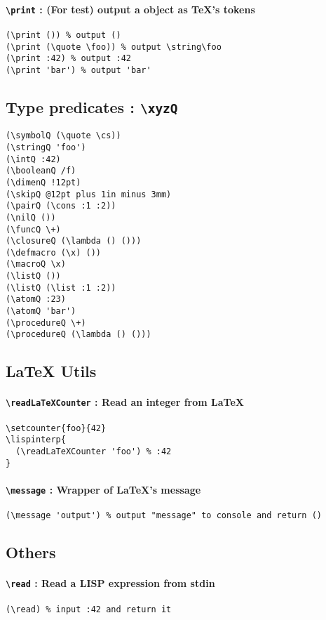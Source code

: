 \documentclass[10pt,a4paper]{article}
\newcommand{\pT}[1]{\textbf{\texttt{\textbackslash #1}}}
\begin{document}
\paragraph{\pT{print} : (For test) output a object as TeX's tokens}
\begin{verbatim}
(\print ()) % output ()
(\print (\quote \foo)) % output \string\foo
(\print :42) % output :42
(\print 'bar') % output 'bar'
\end{verbatim}


\subsection{Type predicates : \pT{xyzQ}}
\begin{verbatim}
(\symbolQ (\quote \cs))
(\stringQ 'foo')
(\intQ :42)
(\booleanQ /f)
(\dimenQ !12pt)
(\skipQ @12pt plus 1in minus 3mm)
(\pairQ (\cons :1 :2))
(\nilQ ())
(\funcQ \+)
(\closureQ (\lambda () ()))
(\defmacro (\x) ())
(\macroQ \x)
(\listQ ())
(\listQ (\list :1 :2))
(\atomQ :23)
(\atomQ 'bar')
(\procedureQ \+)
(\procedureQ (\lambda () ()))
\end{verbatim}

\subsection{LaTeX Utils}

\paragraph{\pT{readLaTeXCounter} : Read an integer from LaTeX}
\begin{verbatim}
\setcounter{foo}{42}
\lispinterp{
  (\readLaTeXCounter 'foo') % :42
}
\end{verbatim}

\paragraph{\pT{message} : Wrapper of LaTeX's message}
\begin{verbatim}
(\message 'output') % output "message" to console and return ()
\end{verbatim}

\subsection{Others}

\paragraph{\pT{read} : Read a LISP expression from stdin}
\begin{verbatim}
(\read) % input :42 and return it
\end{verbatim}
\end{document}
